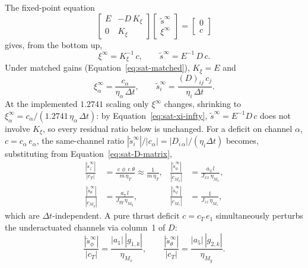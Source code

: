 \documentclass[conf]{new-aiaa}
\DeclareMathOperator{\cs}{c}
\begin{document}
The fixed-point equation
\small
\begin{equation}
\begin{bmatrix} E & -D \, K_\xi \\ 0 & K_\xi \end{bmatrix}
\begin{bmatrix} \tilde s^\infty \\ \xi^\infty \end{bmatrix}
=
\begin{bmatrix} 0 \\ c \end{bmatrix}
\end{equation}
\normalsize
gives, from the bottom up,
\begin{equation}
\label{eq:sat-xi-infty}
\xi^\infty = K_\xi^{-1}\, c,
\qquad
\tilde s^\infty = E^{-1}\, D\, c.
\end{equation}
Under matched gains (Equation~\ref{eq:sat-matched}), $K_\xi = E$ and
\begin{equation}
\xi_\alpha^\infty = \frac{c_\alpha}{\eta_\alpha\, \Delta t},
\qquad
\tilde s_i^\infty = \frac{(D)_{ij}\, c_j}{\eta_i\, \Delta t}.
\end{equation}
At the implemented $1.2741$ scaling only $\xi^\infty$ changes, shrinking to $\xi_\alpha^\infty = c_\alpha/(1.2741\,\eta_\alpha\,\Delta t)$: by Equation~\ref{eq:sat-xi-infty}, $\tilde s^\infty = E^{-1} D\, c$ does not involve $K_\xi$, so every residual ratio below is unchanged. For a deficit on channel $\alpha$, $c = c_\alpha\, e_\alpha$, the same-channel ratio $|\tilde s_i^\infty|/|c_\alpha| = |D_{i\,\alpha}|/(\eta_i \Delta t)$ becomes, substituting from Equation~\ref{eq:sat-D-matrix},
\small
\begin{align}
\label{eq:sat-residual-T}
\frac{|\tilde s_z^\infty|}{|c_T|} &= \frac{\cs\phi\,\cs\theta}{m\, \eta_T} \approx \frac{1}{m\, \eta_T},
&
\frac{|\tilde s_\phi^\infty|}{|c_{M_x}|} &= \frac{a_3\, l}{J_{xx}\, \eta_{M_x}}, \\
\label{eq:sat-residual-theta}
\frac{|\tilde s_\theta^\infty|}{|c_{M_y}|} &= \frac{a_7\, l}{J_{yy}\, \eta_{M_y}},
&
\frac{|\tilde s_\psi^\infty|}{|c_{M_z}|} &= \frac{1}{J_{zz}\, \eta_{M_z}},
\end{align}
\normalsize
which are $\Delta t$-independent. A pure thrust deficit $c = c_T\, e_1$ simultaneously perturbs the underactuated channels via column~1 of $D$:
\small
\begin{equation}
\label{eq:sat-residual-cross}
\frac{|\tilde s_\phi^\infty|}{|c_T|} = \frac{|a_1|\, |g_{1,k}|}{\eta_{M_x}},
\qquad
\frac{|\tilde s_\theta^\infty|}{|c_T|} = \frac{|a_5|\, |g_{2,k}|}{\eta_{M_y}}.
\end{equation}
\normalsize
\end{document}

